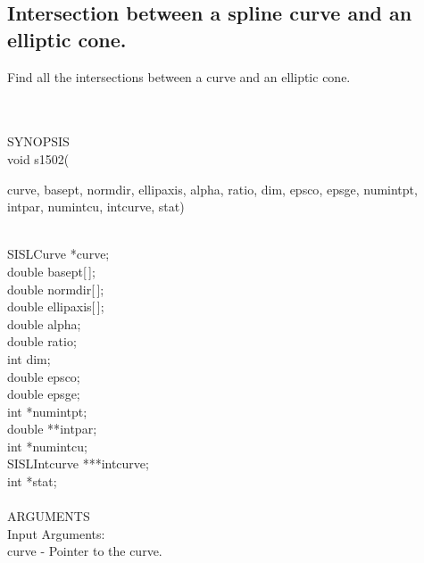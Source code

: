 \subsection{Intersection between a spline curve and an elliptic cone.}
\begin{minipg1}
  Find all the intersections between a curve and an elliptic cone.
\end{minipg1} \\ \\
SYNOPSIS\\
        \>void s1502(\begin{minipg3}
         {\fov curve}, {\fov basept}, {\fov normdir}, {\fov ellipaxis}, {\fov alpha}, {\fov ratio}, {\fov dim}, {\fov epsco}, {\fov epsge}, {\fov numintpt}, {\fov intpar},
                        {\fov numintcu}, {\fov intcurve}, {\fov stat})
                \end{minipg3}\\[0.3ex]
                \>\>    SISLCurve       \>      *{\fov curve};\\
                \>\>    double  \>      {\fov basept}[\,];\\
                \>\>    double  \>      {\fov normdir}[\,];\\
                \>\>    double  \>      {\fov ellipaxis}[\,];\\
                \>\>    double  \>      {\fov alpha};\\
                \>\>    double  \>      {\fov ratio};\\
                \>\>    int     \>      {\fov dim};\\
                \>\>    double  \>      {\fov epsco};\\
                \>\>    double  \>      {\fov epsge};\\
                \>\>    int     \>      *{\fov numintpt};\\
                \>\>    double  \>      **{\fov intpar};\\
                \>\>    int     \>      *{\fov numintcu};\\
                \>\>    SISLIntcurve \> ***{\fov intcurve};\\
                \>\>    int     \>      *{\fov stat};\\
\\
ARGUMENTS\\
        \>Input Arguments:\\
        \>\>    {\fov curve}    \> - \> Pointer to the curve.\\
